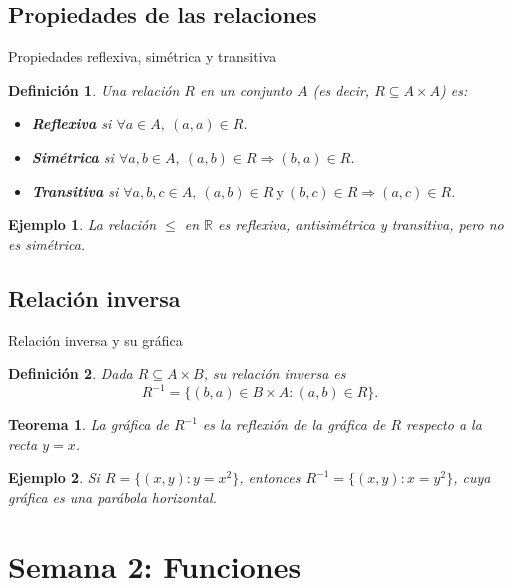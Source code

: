 \documentclass[10pt, spanish]{beamer}
\newtheorem{definicion}{Definición}
\newtheorem{teorema}{Teorema}
\newtheorem{ejemplo}{Ejemplo}
\begin{document}
	\subsection{Propiedades de las relaciones}
	\begin{frame}{Propiedades reflexiva, simétrica y transitiva}
		\begin{definicion}
			Una relación $R$ en un conjunto $A$ (es decir, $R\subseteq A\times A$) es:
			\begin{itemize}
				\item \textbf{Reflexiva} si $\forall a\in A,\ (a,a)\in R$.
				\item \textbf{Simétrica} si $\forall a,b\in A,\ (a,b)\in R \Rightarrow (b,a)\in R$.
				\item \textbf{Transitiva} si $\forall a,b,c\in A,\ (a,b)\in R\ \text{y}\ (b,c)\in R \Rightarrow (a,c)\in R$.
			\end{itemize}
		\end{definicion}
		\begin{ejemplo}
			La relación $\leq$ en $\mathbb{R}$ es reflexiva, antisimétrica y transitiva, pero no es simétrica.
		\end{ejemplo}
	\end{frame}
	
	\subsection{Relación inversa}
	\begin{frame}{Relación inversa y su gráfica}
		\begin{definicion}
			Dada $R\subseteq A\times B$, su \textit{relación inversa} es
			\[
			R^{-1} = \{(b,a)\in B\times A : (a,b)\in R\}.
			\]
		\end{definicion}
		\begin{teorema}
			La gráfica de $R^{-1}$ es la reflexión de la gráfica de $R$ respecto a la recta $y=x$.
		\end{teorema}
		\begin{ejemplo}
			Si $R=\{(x,y): y=x^2\}$, entonces $R^{-1}=\{(x,y): x=y^2\}$, cuya gráfica es una parábola horizontal.
		\end{ejemplo}
	\end{frame}
	
	\section{Semana 2: Funciones}
\end{document}
